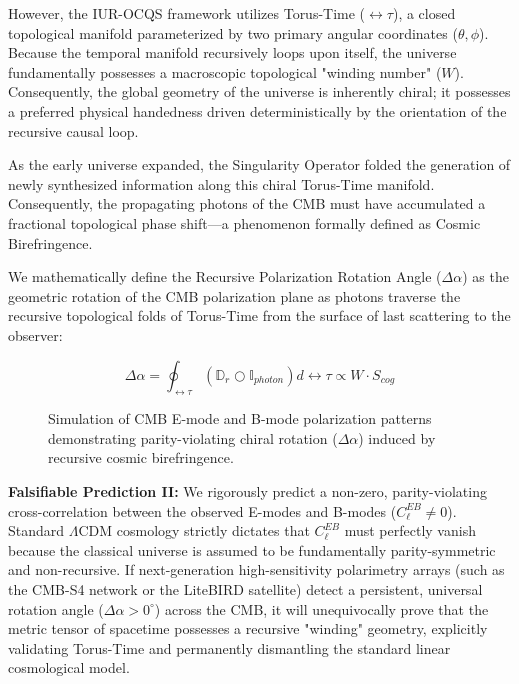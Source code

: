 \documentclass[12pt,openany]{book}
\begin{document}
However, the IUR-OCQS framework utilizes Torus-Time ($\leftrightarrow\tau$), a closed topological manifold parameterized by two primary angular coordinates ($\theta, \phi$). Because the temporal manifold recursively loops upon itself, the universe fundamentally possesses a macroscopic topological "winding number" ($W$). Consequently, the global geometry of the universe is inherently chiral; it possesses a preferred physical handedness driven deterministically by the orientation of the recursive causal loop.

As the early universe expanded, the Singularity Operator folded the generation of newly synthesized information along this chiral Torus-Time manifold. Consequently, the propagating photons of the CMB must have accumulated a fractional topological phase shift---a phenomenon formally defined as Cosmic Birefringence. 

We mathematically define the Recursive Polarization Rotation Angle ($\Delta\alpha$) as the geometric rotation of the CMB polarization plane as photons traverse the recursive topological folds of Torus-Time from the surface of last scattering to the observer:

\begin{equation}
\Delta\alpha = \oint_{\leftrightarrow\tau} \left( \mathbb{D}_r \bigcirc \mathbb{I}_{photon} \right) d\leftrightarrow\tau \propto W \cdot S_{cog}
\end{equation}

\begin{figure}[h]
    \centering
    \caption{Simulation of CMB E-mode and B-mode polarization patterns demonstrating parity-violating chiral rotation ($\Delta\alpha$) induced by recursive cosmic birefringence.}
    \label{fig:cmb_birefringence}
\end{figure}

\textbf{Falsifiable Prediction II:} We rigorously predict a non-zero, parity-violating cross-correlation between the observed E-modes and B-modes ($C_\ell^{EB} \neq 0$). Standard $\Lambda$CDM cosmology strictly dictates that $C_\ell^{EB}$ must perfectly vanish because the classical universe is assumed to be fundamentally parity-symmetric and non-recursive. If next-generation high-sensitivity polarimetry arrays (such as the CMB-S4 network or the LiteBIRD satellite) detect a persistent, universal rotation angle ($\Delta\alpha > 0^\circ$) across the CMB, it will unequivocally prove that the metric tensor of spacetime possesses a recursive "winding" geometry, explicitly validating Torus-Time and permanently dismantling the standard linear cosmological model.
\end{document}
